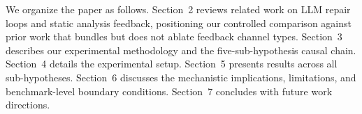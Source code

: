 We organize the paper as follows. Section~2 reviews related work on LLM repair
loops and static analysis feedback, positioning our controlled comparison
against prior work that bundles but does not ablate feedback channel types.
Section~3 describes our experimental methodology and the five-sub-hypothesis
causal chain. Section~4 details the experimental setup. Section~5 presents
results across all sub-hypotheses. Section~6 discusses the mechanistic
implications, limitations, and benchmark-level boundary conditions. Section~7
concludes with future work directions.
